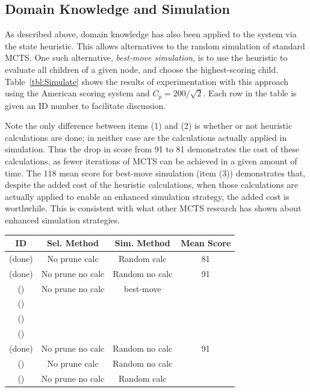 \documentclass[letterpaper]{article}
\begin{document}
\subsection{Domain Knowledge and Simulation}


As described above, domain knowledge has also been applied to the system via the state heuristic. This allows alternatives to the random simulation of standard MCTS. One such alternative, {\it best-move simulation}, is to use the heuristic to evaluate all children of a given node, and choose the highest-scoring child. Table~\ref{tbl:Simulate} shows the results of experimentation with this approach using the American scoring system and $C_p = 200 / \sqrt{2}$. Each row in the table is given an ID number to facilitate discussion.

Note the only difference between items (1) and (2) is whether or not heuristic calculations are done; in neither case are the calculations actually applied in simulation. Thus the drop in score from 91 to 81 demonstrates the cost of these calculations, as fewer iterations of MCTS can be achieved in a given amount of time. The 118 mean score for best-move simulation (item (3)) demonstrates that, despite the added cost of the heuristic calculations, when those calculations are actually applied to enable an enhanced simulation strategy, the added cost is worthwhile. This is consistent with what other MCTS research has shown about enhanced simulation strategies.

\begin{table}
\label{tbl:Selection}
\centering
\begin{tabular}{c c c c}
\hline
ID & Sel. Method & Sim. Method & Mean Score \\
\hline
(done) & No prune calc & Random calc & 81 \\  %
(done) & No prune no calc & Random no calc & 91 \\ %
() & No prune no calc & best-move & \\ %
() & & & \\
() & & & \\
() & & & \\



(done) & No prune no calc & Random no calc & 91 \\
() & No prune calc & Random no calc & \\
() & No prune no calc & Random calc & \\




\hline
\end{tabular}
\end{table}
\end{document}
